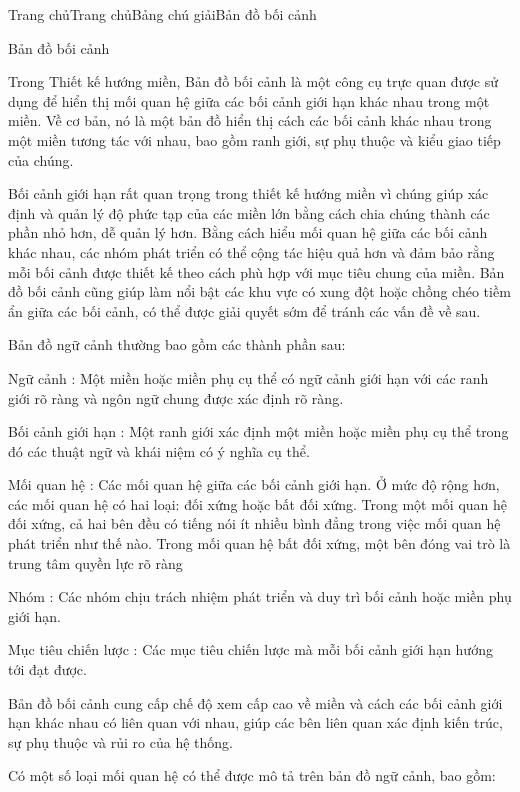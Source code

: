 
Trang chủTrang chủBảng chú giảiBản đồ bối cảnh

Bản đồ bối cảnh

Trong Thiết kế hướng miền, Bản đồ bối cảnh là một công cụ trực quan được sử dụng để hiển thị mối quan hệ giữa các bối cảnh giới hạn khác nhau trong một miền. Về cơ bản, nó là một bản đồ hiển thị cách các bối cảnh khác nhau trong một miền tương tác với nhau, bao gồm ranh giới, sự phụ thuộc và kiểu giao tiếp của chúng.

Bối cảnh giới hạn rất quan trọng trong thiết kế hướng miền vì chúng giúp xác định và quản lý độ phức tạp của các miền lớn bằng cách chia chúng thành các phần nhỏ hơn, dễ quản lý hơn. Bằng cách hiểu mối quan hệ giữa các bối cảnh khác nhau, các nhóm phát triển có thể cộng tác hiệu quả hơn và đảm bảo rằng mỗi bối cảnh được thiết kế theo cách phù hợp với mục tiêu chung của miền. Bản đồ bối cảnh cũng giúp làm nổi bật các khu vực có xung đột hoặc chồng chéo tiềm ẩn giữa các bối cảnh, có thể được giải quyết sớm để tránh các vấn đề về sau.

Bản đồ ngữ cảnh thường bao gồm các thành phần sau:

Ngữ cảnh : Một miền hoặc miền phụ cụ thể có ngữ cảnh giới hạn với các ranh giới rõ ràng và ngôn ngữ chung được xác định rõ ràng.

Bối cảnh giới hạn : Một ranh giới xác định một miền hoặc miền phụ cụ thể trong đó các thuật ngữ và khái niệm có ý nghĩa cụ thể.

Mối quan hệ : Các mối quan hệ giữa các bối cảnh giới hạn. Ở mức độ rộng hơn, các mối quan hệ có hai loại: đối xứng hoặc bất đối xứng. Trong một mối quan hệ đối xứng, cả hai bên đều có tiếng nói ít nhiều bình đẳng trong việc mối quan hệ phát triển như thế nào. Trong mối quan hệ bất đối xứng, một bên đóng vai trò là trung tâm quyền lực rõ ràng

Nhóm : Các nhóm chịu trách nhiệm phát triển và duy trì bối cảnh hoặc miền phụ giới hạn.

Mục tiêu chiến lược : Các mục tiêu chiến lược mà mỗi bối cảnh giới hạn hướng tới đạt được.

Bản đồ bối cảnh cung cấp chế độ xem cấp cao về miền và cách các bối cảnh giới hạn khác nhau có liên quan với nhau, giúp các bên liên quan xác định kiến trúc, sự phụ thuộc và rủi ro của hệ thống.

Có một số loại mối quan hệ có thể được mô tả trên bản đồ ngữ cảnh, bao gồm:


